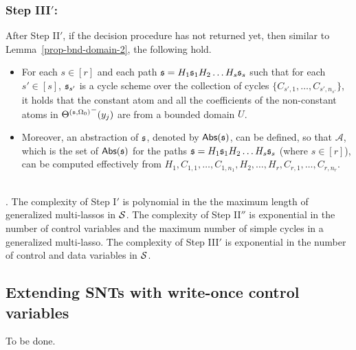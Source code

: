 \subsubsection{Step III$'$:}
After Step II$'$, if the decision procedure has not returned yet, then similar to Lemma~\ref{prop-bnd-domain-2}, the following hold.
\begin{itemize}
\item For each $s \in [r]$ and each path ${\mathfrak{s} }=H_1 {\mathfrak{s} }_1 H_2 \dots H_s {\mathfrak{s} }_s$ such that for each $s'\in [s]$, ${\mathfrak{s} }_{s'}$ is a cycle scheme over the collection of cycles $\{C_{s',1},\dots,C_{s',n_{s'}}\}$, it holds that the constant atom and all the coefficients of the non-constant atoms in ${\Theta^{({\mathfrak{s} },\Omega_0)}}^-(y_j)$ are from a bounded domain $U$.
%
\item Moreover,  an abstraction of ${\mathfrak{s} }$, denoted by $\mathsf{Abs}({\mathfrak{s} })$, can be defined, so that $\mathscr{A}$, which is the set of $\mathsf{Abs}({\mathfrak{s} })$ for the paths ${\mathfrak{s} }=H_1 {\mathfrak{s} }_1 H_2 \dots H_s {\mathfrak{s} }_s$ (where $s \in [r]$), can be computed effectively from 
$H_1, C_{1,1}, \dots, C_{1,n_1},H_2,\dots, H_r,C_{r,1},\dots, C_{r,n_r}$.
\end{itemize}
\smallskip
{}\medskip\\

. The complexity of Step I$'$ is polynomial in the the maximum length of generalized multi-lassos in ${\mathcal{S} }$. The complexity of Step II$''$ is exponential in the number of control variables and the maximum number of simple cycles in a generalized multi-lasso. The complexity of Step III$'$ is exponential in the number of control and data variables in ${\mathcal{S} }$.

\subsection{Extending SNTs with write-once control variables}

To be done.
